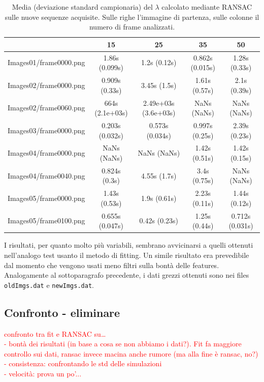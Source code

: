 \documentclass[12pt]{report}
\begin{document}
\begin{table}[H]
\begin{center}
\begin{tabular}{|c|c|c|c|c|}
	\hline
	& 15 & 25 & 35 & 50 \\ \hline
	Images01/frame0000.png & 1.86s (0.099s) & 1.2s (0.12s) & 0.862s (0.015s) & 1.28s (0.33s)\\ \hline
	Images02/frame0000.png & 0.909s (0.33s) & 3.45s (1.5s) & 1.61s (0.57s) & 2.1s (0.39s)\\ \hline
	Images02/frame0060.png & 664s (2.1e+03s) & 2.49e+03s (3.6e+03s) & NaNs (NaNs) & NaNs (NaNs)\\ \hline
	Images03/frame0000.png & 0.203s (0.032s) & 0.573s (0.034s) & 0.997s (0.25s) & 2.39s (0.23s)\\ \hline
	Images04/frame0000.png & NaNs (NaNs) & NaNs (NaNs) & 1.42s (0.51s) & 1.42s (0.15s)\\ \hline
	Images04/frame0040.png & 0.824s (0.3s) & 4.55s (1.7s) & 3.4s (0.75s) & NaNs (NaNs)\\ \hline
	Images05/frame0000.png & 1.43s (0.53s) & 1.9s (0.61s) & 2.23s (0.11s) & 1.44s (0.12s)\\ \hline
	Images05/frame0100.png & 0.655s (0.047s) & 0.42s (0.23s) & 1.25s (0.44s) & 0.712s (0.031s)\\ \hline
\end{tabular}
\caption{Media (deviazione standard campionaria) del $\lambda$ calcolato mediante RANSAC sulle nuove sequenze acquisite. Sulle righe l'immagine di partenza, sulle colonne il numero di frame analizzati.}
\label{tab:ransNew}
\end{center}
\end{table}

\noindent I risultati, per quanto molto pi\`u variabili, sembrano avvicinarsi a quelli ottenuti nell'analogo test usanto il metodo di fitting. Un simile risultato era prevedibile dal momento che vengono usati meno filtri sulla bont\`a delle features. \\

\noindent Analogamente al sottoparagrafo precedente, i  dati grezzi ottenuti sono nei files \verb|oldImgs.dat| e \verb|newImgs.dat|.




\subsection{Confronto - eliminare}

\noindent \textcolor{red}{confronto tra fit e RANSAC su\dots\\
- bont\`a dei risultati (in base a cosa se non abbiamo i dati?). Fit fa maggiore controllo sui dati, ransac invece macina anche rumore (ma alla fine \`e ransac, no?) \\
- consistenza: confrontando le std delle simulazioni \\
- velocit\`a: prova un po'...}
\end{document}
